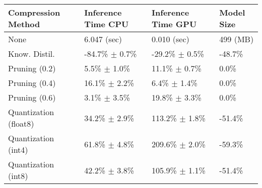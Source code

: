 \begin{tabular}{llll}
\toprule
\textbf{Compression Method} & \textbf{Inference Time CPU} & \textbf{Inference Time GPU} & \textbf{Model Size} \\
\midrule
None & 6.047 (sec) & 0.010 (sec) & 499 (MB) \\
Know. Distil. & -84.7\% $\pm$ 0.7\% & -29.2\% $\pm$ 0.5\% & -48.7\% \\
Pruning (0.2) & 5.5\% $\pm$ 1.0\% & 11.1\% $\pm$ 0.7\% & 0.0\% \\
Pruning (0.4) & 16.1\% $\pm$ 2.2\% & 6.4\% $\pm$ 1.4\% & 0.0\% \\
Pruning (0.6) & 3.1\% $\pm$ 3.5\% & 19.8\% $\pm$ 3.3\% & 0.0\% \\
Quantization (float8) & 34.2\% $\pm$ 2.9\% & 113.2\% $\pm$ 1.8\% & -51.4\% \\
Quantization (int4) & 61.8\% $\pm$ 4.8\% & 209.6\% $\pm$ 2.0\% & -59.3\% \\
Quantization (int8) & 42.2\% $\pm$ 3.8\% & 105.9\% $\pm$ 1.1\% & -51.4\% \\
\bottomrule
\end{tabular}
